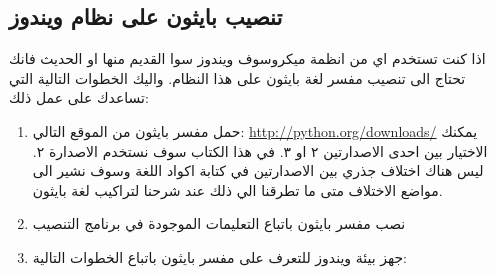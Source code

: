 \subsection{تنصيب بايثون على نظام ويندوز}

اذا كنت تستخدم اي من انظمة ميكروسوف ويندوز سوا القديم منها او الحديث فانك تحتاج الى تنصيب مفسر لغة بايثون على هذا النظام. واليك الخطوات التالية التي 
تساعدك على عمل ذلك:
\begin{enumerate}
\item
حمل مفسر بايثون من الموقع التالي:
\href{https://www.python.org/downloads/}{http://python.org/downloads/}
يمكنك الاختيار بين احدى الاصدارتين ٢ او ٣. في هذا الكتاب سوف نستخدم الاصدارة ٢. ليس هناك اختلاف جذري بين الاصدارتين في كتابة اكواد اللغة وسوف نشير الى مواضع الاختلاف متى ما تطرقنا الي ذلك عند شرحنا لتراكيب لغة بايثون.
\item
نصب مفسر بايثون باتباع التعليمات الموجودة في برنامج التنصيب
\item
جهز بيئة ويندوز للتعرف على مفسر بايثون باتباع الخطوات التالية:
\end{enumerate}
